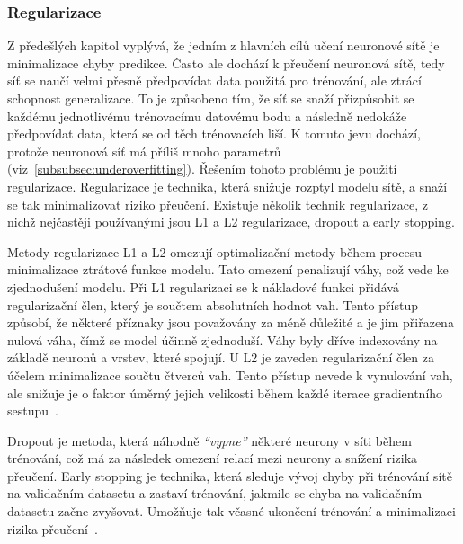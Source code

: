 \subsubsection{Regularizace}
Z předešlých kapitol vyplývá, že jedním z hlavních cílů učení neuronové sítě je
minimalizace chyby predikce. Často ale dochází k přeučení neuronová sítě, tedy
síť se naučí velmi přesně předpovídat data použitá pro trénování, ale ztrácí
schopnost generalizace. To je způsobeno tím, že síť se snaží přizpůsobit se
každému jednotlivému trénovacímu datovému bodu a následně nedokáže předpovídat
data, která se od těch trénovacích liší. K tomuto jevu dochází, protože
neuronová síť má příliš mnoho parametrů (viz~\ref{subsubsec:underoverfitting}).
Řešením tohoto problému je použití regularizace. Regularizace je technika, která
snižuje rozptyl modelu sítě, a snaží se tak minimalizovat riziko přeučení.
Existuje několik technik regularizace, z nichž nejčastěji používanými jsou L1 a
L2 regularizace, dropout a early stopping.

Metody regularizace L1 a L2 omezují optimalizační metody během procesu
minimalizace ztrátové funkce modelu. Tato omezení penalizují váhy, což vede ke
zjednodušení modelu. Při L1 regularizaci se k nákladové funkci přidává
regularizační člen, který je součtem absolutních hodnot vah. Tento přístup
způsobí, že některé příznaky jsou považovány za méně důležité a je jim přiřazena
nulová váha, čímž se model účinně zjednoduší. Váhy byly dříve indexovány na
základě neuronů a vrstev, které spojují. U L2 je zaveden regularizační člen za
účelem minimalizace součtu čtverců vah. Tento přístup nevede k vynulování vah,
ale snižuje je o faktor úměrný jejich velikosti během každé iterace gradientního
sestupu~\cite{Aurelien2022,Goodfellow2016}.

Dropout je metoda, která náhodně \emph{\enquote{vypne}} některé neurony v síti
během trénování, což má za následek omezení relací mezi neurony a snížení rizika
přeučení. Early stopping je technika, která sleduje vývoj chyby při trénování
sítě na validačním datasetu a zastaví trénování, jakmile se chyba na validačním
datasetu začne zvyšovat. Umožňuje tak včasné ukončení trénování a minimalizaci
rizika přeučení~\cite{Aurelien2022,Goodfellow2016}.
